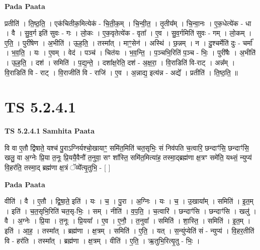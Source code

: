\documentclass[17pt]{extarticle}
\begin{document}
\textbf{Pada Paata} \newline

प्रतीति॑ । ति॒ष्ठ॒ति॒ । एक॑चितीक॒मित्येक॑ - चि॒ती॒क॒म् । चि॒न्वी॒त॒ । तृ॒तीय᳚म् । चि॒न्वा॒नः । ए॒क॒धेत्ये॑क - धा । वै । सु॒व॒र्ग इति॑ सुवः - गः । लो॒कः । ए॒क॒वृतेत्ये॑क - वृता᳚ । ए॒व । सु॒व॒र्गमिति॑ सुवः - गम् । लो॒कम् । ए॒ति॒ । पुरी॑षेण । अ॒भीति॑ । ऊ॒ह॒ति॒ । तस्मा᳚त् । माꣳ॒॒सेन॑ । अस्थि॑ । छ॒न्नम् । न । दु॒श्चर्मेति॑ दुः - चर्मा᳚ । भ॒व॒ति॒ । यः । ए॒वम् । वेद॑ । पञ्च॑ । चित॑यः । भ॒व॒न्ति॒ । प॒ञ्चभि॒रिति॑ प॒ञ्च - भिः॒ । पुरी॑षैः । अ॒भीति॑ । ऊ॒ह॒ति॒ । दश॑ । समिति॑ । प॒द्य॒न्ते॒ । दशा᳚क्ष॒रेति॒ दश॑ - अ॒क्ष॒रा॒ । वि॒राडिति॑ वि-राट् । अन्न᳚म् । वि॒राडिति॑ वि - राट् । वि॒राजीति॑ वि - राजि॑ । ए॒व । अ॒न्नाद्य॒ इत्य॑न्न - अद्ये᳚ । प्रतीति॑ । ति॒ष्ठ॒ति॒ ॥  \newline




\section*{ TS 5.2.4.1 }

\textbf{TS 5.2.4.1 } \newline
\textbf{Samhita Paata} \newline

वि वा ए॒तौ द्वि॑षाते॒ यश्च॑ पु॒राऽग्निर्यश्चो॒खायाꣳ॒॒ समि॑त॒मिति॑ चत॒सृभिः॒ सं निव॑पति च॒त्वारि॒ छन्दाꣳ॑सि॒ छन्दाꣳ॑सि॒ खलु॒ वा अ॒ग्नेः प्रि॒या त॒नूः प्रि॒ययै॒वैनौ॑ त॒नुवा॒ सꣳ शा᳚स्ति॒ समि॑त॒मित्या॑ह॒ तस्मा॒द्ब्रह्म॑णा क्ष॒त्रꣳ समे॑ति॒ यथ्सं॒ न्युप्य॑ वि॒हर॑ति॒ तस्मा॒द् ब्रह्म॑णा क्ष॒त्रं ॅव्ये᳚त्यृ॒तुभि॒ - [  ] \newline

\textbf{Pada Paata} \newline

वीति॑ । वै । ए॒तौ । द्वि॒षा॒ते॒ इति॑ । यः । च॒ । पु॒रा । अ॒ग्निः । यः । च॒ । उ॒खाया᳚म् । समिति॑ । इ॒त॒म् । इति॑ । च॒त॒सृभि॒रिति॑ चत॒सृ-भिः॒ । सम् । नीति॑ । व॒प॒ति॒ । च॒त्वारि॑ । छन्दाꣳ॑सि । छन्दाꣳ॑सि । खलु॑ । वै । अ॒ग्नेः । प्रि॒या । त॒नूः । प्रि॒यया᳚ । ए॒व । ए॒नौ॒ । त॒नुवा᳚ । समिति॑ । शा॒स्ति॒ । समिति॑ । इ॒त॒म् । इति॑ । आ॒ह॒ । तस्मा᳚त् । ब्रह्म॑णा । क्ष॒त्रम् । समिति॑ । ए॒ति॒ । यत् । स॒न्युंप्येति॑ सं - न्युप्य॑ । वि॒हर॒तीति॑ वि - हर॑ति । तस्मा᳚त् । ब्रह्म॑णा । क्ष॒त्रम् । वीति॑ । ए॒ति॒ । ऋ॒तुभि॒रित्यृ॒तु - भिः॒ ।  \newline




\end{document}
